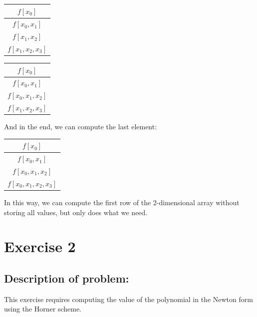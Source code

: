 \documentclass{article}
\begin{document}
\begin{center}
    \begin{minipage}{0.45\textwidth}
        \centering
        \begin{tabular}{| c |}
            \hline
            $f[x_0]$\\ 
            \hline
            $f[x_0, x_1]$\\
            \hline
            $f[x_1, x_2]$\\
            \hline
            $f[x_1, x_2, x_3]$\\ 
            \hline
        \end{tabular}
    \end{minipage}
    \hspace{1cm} 
    \begin{minipage}{0.45\textwidth}
        \centering
        \begin{tabular}{| c |}
            \hline
            $f[x_0]$\\ 
            \hline
            $f[x_0, x_1]$\\
            \hline
            $f[x_0, x_1, x_2]$\\
            \hline
            $f[x_1, x_2, x_3]$\\ 
            \hline
        \end{tabular}
    \end{minipage}
\end{center}
And in the end, we can compute the last element:

\begin{center}
    \begin{tabular}{| c |}
        \hline
        $f[x_0]$\\ 
        \hline
        $f[x_0, x_1]$\\
        \hline
        $f[x_0, x_1, x_2]$\\
        \hline
        $f[x_0, x_1, x_2, x_3]$\\ 
        \hline
    \end{tabular}
\end{center}
In this way, we can compute the first row of the 2-dimensional array without storing all values, but only does what we need.

\section*{Exercise 2}

\subsection*{Description of problem:}
This exercise requires computing the value of the polynomial in the Newton form using the Horner scheme.
\end{document}
